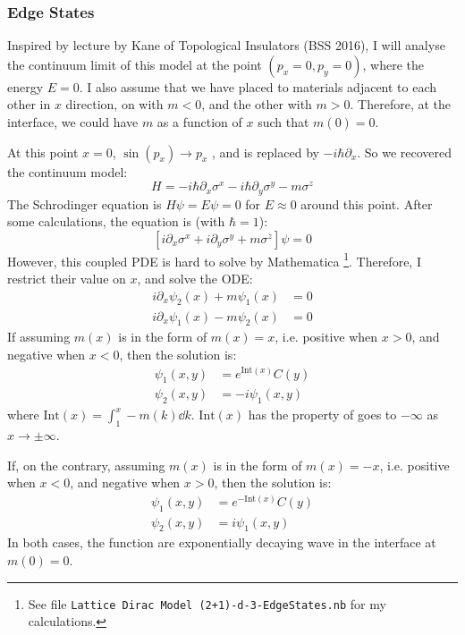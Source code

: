 \documentclass{article}
\begin{document}
    \subsubsection{Edge States}
    \label{sec:Edge States}
    Inspired by lecture by Kane of Topological Insulators (BSS 2016), I
    will analyse the continuum limit of this model at the  point
    $(p_x=0,p_y=0)$, where the energy $E=0$. I also assume that we have placed
    to materials adjacent to each other in $x$ direction, on with
    $m<0$, and the other with $m>0$. Therefore, at the interface, we
    could have $m$ as a function of $x$ such that $m(0)=0$.

    At this point $x=0$, $\sin(p_x)\to p_x$ , and is replaced by $-i\hbar
    \partial _x$. So we recovered the continuum model:
    \begin{equation}
        H = -i\hbar\partial_x \sigma^x 
        -i\hbar\partial_y \sigma^y -m \sigma^z
    \end{equation}
    The Schrodinger equation is $H\psi =E\psi = 0$ for $E\approx 0$
    around this point. After some calculations, the equation is (with
    $\hbar=1$):
    \begin{equation}
        \left[i\partial_x \sigma^x + i\partial_y \sigma^y +
        m\sigma^z\right] \psi = 0
    \end{equation}
    However, this coupled PDE is hard to solve by Mathematica
    \footnote{See file \texttt{Lattice Dirac Model
    (2+1)-d-3-EdgeStates.nb} for my calculations.}. Therefore, I
    restrict their value on $x$, and solve the ODE:
    \begin{align}
        i\partial_x \psi_2(x) + m\psi_1(x) &= 0 \\
        i\partial_x \psi_1(x) - m\psi_2(x) &= 0
    \end{align}
    If assuming $m(x)$ is in the form of $m(x)=x$, i.e. positive when
    $x>0$, and negative when $x<0$, then the solution is:
    \begin{align}
        \psi_1 (x,y) &= e^{\text{Int}(x)} C(y) \\
        \psi_2 (x,y) &= -i \psi_1(x,y)
    \end{align}
    where $\text{Int}(x)=\int_1^x -m(k)\dd{k}$. $\text{Int}(x)$ has the
    property of goes to $-\infty$ as $x\to \pm\infty$.

    If, on the contrary, assuming $m(x)$ is in the form of $m(x)=-x$, i.e. positive when $x<0$, and negative when $x>0$, then the solution is:
    \begin{align}
        \psi_1 (x,y) &= e^{-\text{Int}(x)} C(y) \\
        \psi_2 (x,y) &= i \psi_1(x,y)
    \end{align}
    In both cases, the function are exponentially decaying wave in the
    interface at $m(0)=0$.
\end{document}
